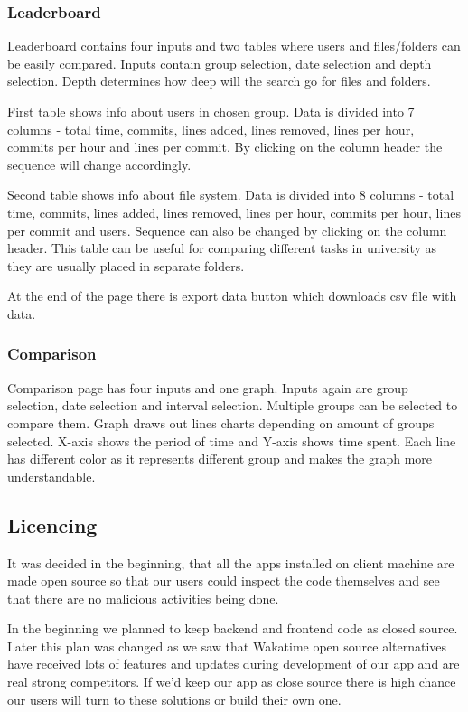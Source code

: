 \subsubsection{Leaderboard}\label{subsubsec:leaderboard}
Leaderboard contains four inputs and two tables where users and files/folders can be easily compared.
Inputs contain group selection, date selection and depth selection.
Depth determines how deep will the search go for files and folders.

First table shows info about users in chosen group.
Data is divided into 7 columns - total time, commits, lines added, lines removed, lines per hour, commits per hour and lines per commit.
By clicking on the column header the sequence will change accordingly.

Second table shows info about file system.
Data is divided into 8 columns - total time, commits, lines added, lines removed, lines per hour, commits per hour, lines per commit and users.
Sequence can also be changed by clicking on the column header.
This table can be useful for comparing different tasks in university as they are usually placed in separate folders.

At the end of the page there is export data button which downloads csv file with data.

\subsubsection{Comparison}\label{subsubsec:comparison}
Comparison page has four inputs and one graph.
Inputs again are group selection, date selection and interval selection.
Multiple groups can be selected to compare them.
Graph draws out lines charts depending on amount of groups selected.
X-axis shows the period of time and Y-axis shows time spent.
Each line has different color as it represents different group and makes the graph more understandable.

\subsection{Licencing}\label{subsec:licencing}
It was decided in the beginning, that all the apps installed on client machine are made open source so that
our users could inspect the code themselves and see that there are no malicious activities being done.

In the beginning we planned to keep backend and frontend code as closed source.
Later this plan was changed as we saw that Wakatime open source alternatives have received lots of features and updates
during development of our app and are real strong competitors.
If we'd keep our app as close source there is high chance our users will turn to these solutions or build their own one.

